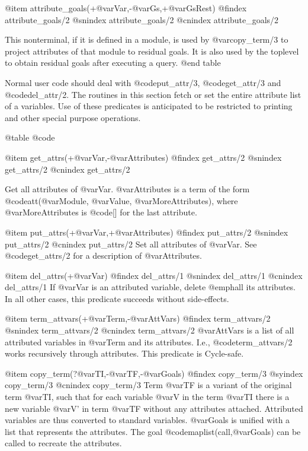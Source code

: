 {{{{{{{{{@item attribute_goals(+@var{Var},-@var{Gs},+@var{GsRest})
@findex attribute_goals/2
@snindex attribute_goals/2
@cnindex attribute_goals/2

This nonterminal, if it is defined in a module, is used by @var{copy_term/3}
to project attributes of that module to residual goals. It is also
used by the toplevel to obtain residual goals after executing a query.
@end table

Normal user code should deal with @code{put_attr/3}, @code{get_attr/3} and @code{del_attr/2}.
The routines in this section fetch or set the entire attribute list of a
variables. Use of these predicates is anticipated to be restricted to
printing and other special purpose operations.

@table @code

@item get_attrs(+@var{Var},-@var{Attributes})
@findex get_attrs/2
@snindex get_attrs/2
@cnindex get_attrs/2

Get all attributes of @var{Var}. @var{Attributes} is a term of the form
@code{att(@var{Module}, @var{Value}, @var{MoreAttributes})}, where @var{MoreAttributes} is
@code{[]} for the last attribute.

@item put_attrs(+@var{Var},+@var{Attributes})
@findex put_attrs/2
@snindex put_attrs/2
@cnindex put_attrs/2
Set all attributes of @var{Var}.  See @code{get_attrs/2} for a description of
@var{Attributes}.

@item del_attrs(+@var{Var})
@findex del_attrs/1
@snindex del_attrs/1
@cnindex del_attrs/1
If @var{Var} is an attributed variable, delete @emph{all} its
attributes.  In all other cases, this predicate succeeds without
side-effects.

@item term_attvars(+@var{Term},-@var{AttVars})
@findex term_attvars/2
@snindex term_attvars/2
@cnindex term_attvars/2
@var{AttVars} is a list of all attributed variables in @var{Term} and
its attributes. I.e., @code{term_attvars/2} works recursively through
attributes.  This predicate is Cycle-safe.

@item copy_term(?@var{TI},-@var{TF},-@var{Goals}) 
@findex copy_term/3
@syindex copy_term/3
@cnindex copy_term/3
Term @var{TF} is a variant of the original term @var{TI}, such that for
each variable @var{V} in the term @var{TI} there is a new variable @var{V'}
in term @var{TF} without any attributes attached.  Attributed
variables are thus converted to standard variables.  @var{Goals} is
unified with a list that represents the attributes.  The goal
@code{maplist(call,@var{Goals})} can be called to recreate the
attributes.

}}}}}}}}}
